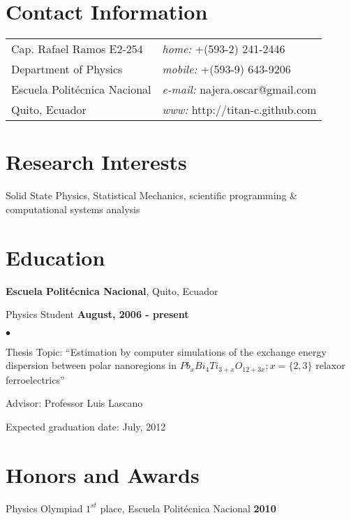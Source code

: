 \documentclass[margin,line]{res}
\newenvironment{list1}{
  \begin{list}{\ding{113}}{%
      \setlength{\itemsep}{0in}
      \setlength{\parsep}{0in} \setlength{\parskip}{0in}
      \setlength{\topsep}{0in} \setlength{\partopsep}{0in} 
      \setlength{\leftmargin}{0.17in}}}{\end{list}}
\newenvironment{list2}{
  \begin{list}{$\bullet$}{%
      \setlength{\itemsep}{0in}
      \setlength{\parsep}{0in} \setlength{\parskip}{0in}
      \setlength{\topsep}{0in} \setlength{\partopsep}{0in} 
      \setlength{\leftmargin}{0.2in}}}{\end{list}}
\begin{document}

\begin{resume}
\section{\sc Contact Information}
\vspace{.05in}
\begin{tabular}{@{}p{2in}p{4in}}
Cap. Rafael Ramos E2-254	& {\it home:}  +(593-2) 241-2446 \\            
Department of Physics		& {\it mobile:} +(593-9) 643-9206 \\         
Escuela Politécnica Nacional	& {\it e-mail:}  najera.oscar@gmail.com\\       
Quito, Ecuador			& {\it www:} http://titan-c.github.com \\     
\end{tabular}


\section{\sc Research Interests}
Solid State Physics, Statistical Mechanics, scientific programming \&
computational systems analysis

\section{\sc Education}
{\bf Escuela Politécnica Nacional}, Quito, Ecuador\\
\vspace*{-.1in}
\begin{list1}
\item[] Physics Student \hfill {\bf August, 2006 - present}\\
\begin{list2}
\vspace*{.05in}
\item Thesis Topic:  ``Estimation by computer simulations of the exchange energy dispersion between polar nanoregions in $Pb_xBi_4Ti_{3+x}O_{12+3x}; x=\{2,3\}$ relaxor ferroelectrics'' 
\item Advisor: Professor Luis Lascano
\item Expected graduation date: July, 2012
\end{list2}
\end{list1}

\section{\sc Honors and Awards} 
Physics Olympiad $1^{st}$ place, Escuela Politécnica Nacional \hfill {\bf 2010}


\end{resume}
\end{document}
